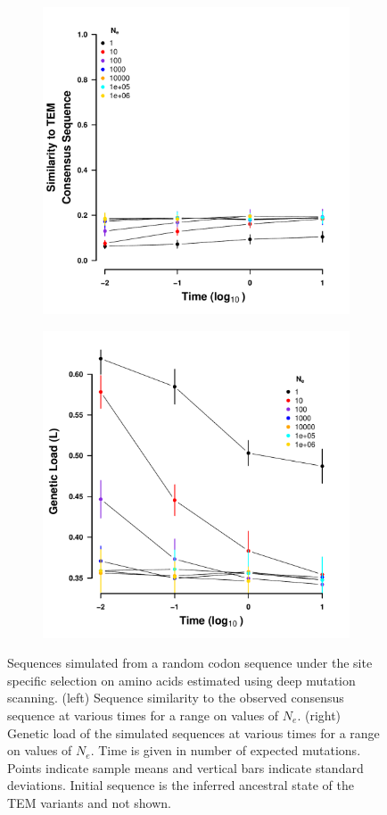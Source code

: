 \documentclass[12pt]{article}
\begin{document}
\begin{figure}[h]
    \centering
    \begin{subfigure}
        \centering
        \includegraphics[width=.45\textwidth]{img/simulated_dist_time_DMS_random.pdf}
    \end{subfigure}
    \begin{subfigure}
        \centering
        \includegraphics[width=.45\textwidth]{img/simulated_gl_time_DMS_random.pdf}
    \end{subfigure}
    \caption{{Sequences simulated from a random codon sequence under the site specific selection on amino acids estimated using deep mutation scanning. 
    (left) Sequence similarity to the observed consensus sequence at various times for a range on values of $N_e$.
    (right) Genetic load of the simulated sequences at various times for a range on values of $N_e$.
    Time is given in number of expected mutations.
    Points indicate sample means and vertical bars indicate standard deviations. Initial sequence is the inferred ancestral state of the TEM variants and not shown.}}
    \label{fig:selac_sim_rand}
\end{figure}
\end{document}
